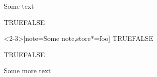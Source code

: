 \documentclass[noamsthm]{beamer}
\makeatletter
\def\IfAnotherSlide#1#2{\ifbeamer@anotherslide #1\else #2\fi}
\def\slideinframe{\beamer@slideinframe}
\makeatother
\begin{document}
\begin{frame}
\end{frame}

\begin{frame}
Some text
\begin{theorem}[store=abc]
\the\slideinframe
\IfAnotherSlide{TRUE}{FALSE}
\end{theorem}
\begin{theorem}<2-3>[note=Some note,store*=foo]
\the\slideinframe
\IfAnotherSlide{TRUE}{FALSE}
\end{theorem}
\begin{theorem}[last]
\the\slideinframe
\IfAnotherSlide{TRUE}{FALSE}
\end{theorem}
Some more text
\end{frame}
\end{document}
